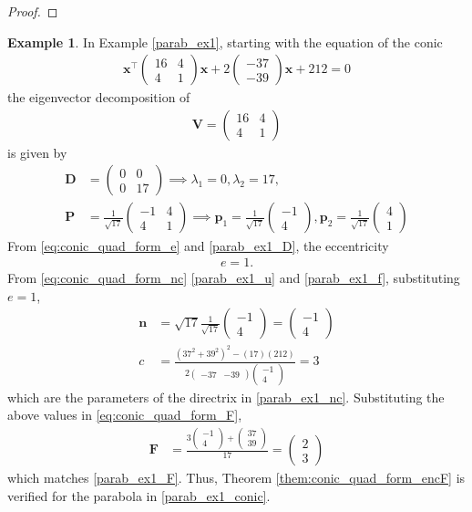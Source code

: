 \documentclass[]{interact}
\theoremstyle{plain}%
\theoremstyle{definition}
\newtheorem{example}[theorem]{Example}
\theoremstyle{remark}
\providecommand{\brak}[1]{\ensuremath{\left(#1\right)}}
\newcommand{\myvec}[1]{\ensuremath{\begin{pmatrix}#1\end{pmatrix}}}
\let\vec\mathbf
\begin{document}
\begin{proof}
\end{proof}
\begin{example}
In Example \ref{parab_ex1}, starting with the equation of the conic
\begin{align}
  \label{parab_ex1_conic}
  \vec{x}^{\top}\myvec{16 &  4 \\  4 & 1}\vec{x} + 
   2 \myvec{-37\\-39}\vec{x}+ 212 = 0
  \end{align}
  the eigenvector decomposition of 
  \begin{align}
    \vec{V} = \myvec{16 &  4 \\  4 & 1}
    \end{align}
    is given by 
    \begin{align}
    \label{parab_ex1_D}
      \vec{D} &= \myvec{0 &  0 \\  0 & 17} \implies \lambda_1 = 0, \lambda_2 = 17,
      \\
      \label{parab_ex1_P}
      \vec{P} &= \frac{1}{\sqrt{17}}\myvec{-1 &  4 \\  4 & 1} \implies \vec{p}_1 = \frac{1}{\sqrt{17}}\myvec{-1  \\  4 }, \vec{p}_2 = \frac{1}{\sqrt{17}}\myvec{4  \\  1 }
      \end{align}
%      
From \eqref{eq:conic_quad_form_e} and     \eqref{parab_ex1_D}, the eccentricity
\begin{align}
e = 1.
    \end{align}
    From \eqref{eq:conic_quad_form_nc} \eqref{parab_ex1_u} and \eqref{parab_ex1_f}, substituting $e = 1$,  
      \begin{align}
        \vec{n}&= \sqrt{17}\frac{1}{\sqrt{17}}\myvec{-1 \\  4 } = \myvec{-1 \\  4 }
        \\
        c &= \frac{\brak{37^2+39^2}^2 - (17) (212)   }{2\myvec{-37&-39}\myvec{-1 \\  4 }} = 3
     \end{align}  
     which are the parameters of the directrix in \eqref{parab_ex1_nc}.  Substituting the above values in \eqref{eq:conic_quad_form_F},
     \begin{align}
      \vec{F}  &= \frac{3\myvec{-1 \\  4 }+\myvec{37\\39}}{17} = \myvec{2\\3}
     \end{align}  
     which matches \eqref{parab_ex1_F}.  Thus, Theorem \ref{them:conic_quad_form_encF} is verified for the parabola in \eqref{parab_ex1_conic}.
\end{example}
\end{document}
